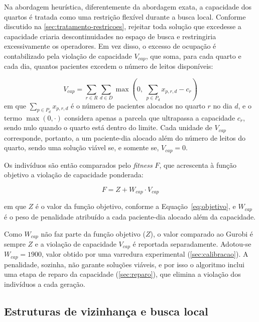 Na abordagem heurística, diferentemente da abordagem exata, a capacidade dos quartos é tratada como uma restrição flexível durante a busca local. Conforme discutido na \autoref{sec:tratamento-restricoes}, rejeitar toda solução que excedesse a capacidade criaria descontinuidades no espaço de busca e restringiria excessivamente os operadores. Em vez disso, o excesso de ocupação é contabilizado pela violação de capacidade $V_{cap}$, que soma, para cada quarto e cada dia, quantos pacientes excedem o número de leitos disponíveis:

\begin{equation}
    V_{cap} = \sum_{r \in R} \sum_{d \in D} \max\left(0,\ \sum_{p \in P_d} x_{p,r,d} - c_r\right)
    \label{eq:violacao-capacidade}
\end{equation}
em que $\sum_{p \in P_d} x_{p,r,d}$ é o número de pacientes alocados no quarto $r$ no dia $d$, e o termo $\max(0, \cdot)$ considera apenas a parcela que ultrapassa a capacidade $c_r$, sendo nulo quando o quarto está dentro do limite. Cada unidade de $V_{cap}$ corresponde, portanto, a um paciente-dia alocado além do número de leitos do quarto, sendo uma solução viável se, e somente se, $V_{cap} = 0$.

Os indivíduos são então comparados pelo \textit{fitness} $F$, que acrescenta à função objetivo a violação de capacidade ponderada:

\begin{equation}
    F = Z + W_{cap} \cdot V_{cap}
    \label{eq:fitness}
\end{equation}

em que $Z$ é o valor da função objetivo, conforme a Equação~\eqref{eq:objetivo}, e $W_{cap}$ é o peso de penalidade atribuído a cada paciente-dia alocado além da capacidade.


Como $W_{cap}$ não faz parte da função objetivo ($Z$), o valor comparado ao Gurobi é sempre $Z$ e a violação de capacidade $V_{cap}$ é reportada separadamente. Adotou-se $W_{cap} = 1900$, valor obtido por uma varredura experimental (\autoref{sec:calibracao}). A penalidade, sozinha, não garante soluções viáveis, e por isso o algoritmo inclui uma etapa de reparo da capacidade (\autoref{sec:reparo}), que elimina a violação dos indivíduos a cada geração.


\subsection{Estruturas de vizinhança e busca local}
\label{sec:vnd}

